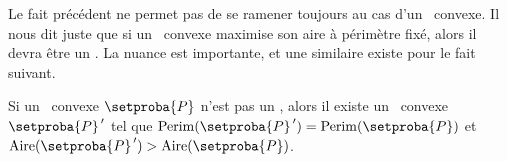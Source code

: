 \begin{remark}
	Le fait précédent ne permet pas de se ramener toujours au cas d'un \nequi\ convexe. Il nous dit juste que si un \ngone\ convexe maximise son aire à périmètre fixé, alors il devra être un \nequi. La nuance est importante, et une similaire existe pour le fait suivant.
\end{remark}




\begin{fact} \label{almost-reg-poly}
	Si un \nequi\ convexe $\setproba{P}$ n'est pas un \niso,
	alors il existe un \ngone\ convexe $\setproba{P}^{\,\prime}$ tel que
	$\perim{\setproba{P}^{\,\prime}} = \perim{\setproba{P}}$
	et
	$\area{\setproba{P}^{\,\prime}} > \area{\setproba{P}}$.
\end{fact}



